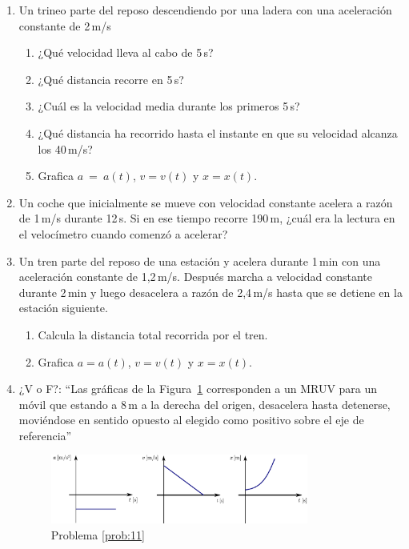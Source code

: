 \begin{enumerate}
  \item Un trineo parte del reposo descendiendo por una ladera con una aceleración constante de 2\,m/s
  \begin{enumerate}[label=\alph*)]
    \item ¿Qué velocidad lleva al cabo de 5\,s?
    \item ¿Qué distancia recorre en 5\,s?
    \item ¿Cuál es la velocidad media durante los primeros 5\,s?
    \item ¿Qué distancia ha recorrido hasta el instante en que su velocidad alcanza los 40\,m/s?
    \item Grafica $a\ =\ a(t)$, $v =  v(t)$ y $x =  x(t)$.
  \end{enumerate}


\item Un coche que inicialmente se mueve con velocidad constante acelera a razón de 1\,m/s durante 12\,s. Si en ese tiempo recorre 190\,m, ¿cuál era la lectura en el velocímetro cuando comenzó a acelerar?

  \item Un tren parte del reposo de una estación y acelera durante 1\,min con una aceleración constante de 1,2\,m/s. Después marcha a velocidad constante durante 2\,min y luego desacelera a razón de 2,4\,m/s hasta que se detiene en la estación siguiente.
  \begin{enumerate}[label=\alph*)]
    \item Calcula la distancia total recorrida por el tren.
    \item Grafica $a =  a(t)$, $v =  v(t)$ y $x =  x(t)$.
  \end{enumerate}
  
   
  \item \label{prob:11} ¿V o  F?: ``Las gráficas de la Figura~\ref{fig:prob11} corresponden a un MRUV para un móvil que estando a 8\,m a la derecha del origen, desacelera hasta detenerse, moviéndose en sentido opuesto al elegido como positivo sobre el eje de referencia''

\begin{figure}[!htb]
      \centering
      \includegraphics[width=0.8\textwidth]{img/prob11.pdf}
      \caption{\label{fig:prob11} Problema \ref{prob:11}}
  \end{figure}
    


\end{enumerate}
